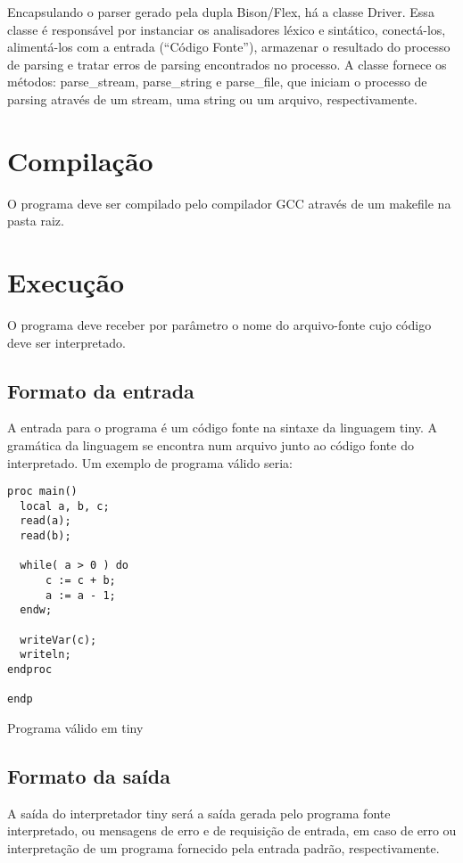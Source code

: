 \documentclass[12pt]{article}
\begin{document}
Encapsulando o parser gerado pela dupla Bison/Flex, há a classe Driver. Essa
classe é responsável por instanciar os analisadores léxico e sintático,
conectá-los, alimentá-los com a entrada (``Código Fonte''), armazenar o
resultado do processo de parsing e tratar erros de parsing encontrados no
processo. A classe fornece os métodos: parse\_stream, parse\_string e 
parse\_file, que iniciam o processo de parsing através de um stream, uma string
ou um arquivo, respectivamente.



\section{Compilação}

O programa deve ser compilado pelo compilador GCC através de um makefile na pasta raiz.

\section{Execução}

O programa deve receber por parâmetro o nome do arquivo-fonte cujo código deve 
ser interpretado.

\subsection{Formato da entrada}

A entrada para o programa é um código fonte na sintaxe da linguagem tiny. A
gramática da linguagem se encontra num arquivo junto ao código fonte do
interpretado. Um exemplo de programa válido seria:

\begin{algorithm}[h!]
\begin{footnotesize}
\begin{verbatim}
proc main()
  local a, b, c;
  read(a);
  read(b);

  while( a > 0 ) do
      c := c + b;
      a := a - 1;
  endw;

  writeVar(c);
  writeln;
endproc

endp
\end{verbatim}	
\caption{Programa válido em tiny}%
\end{footnotesize}
\end{algorithm}



\subsection{Formato da saída}

A saída do interpretador tiny será a saída gerada pelo programa fonte
interpretado, ou mensagens de erro e de requisição de entrada, em caso de erro
ou interpretação de um programa fornecido pela entrada padrão, respectivamente.



\end{document}
